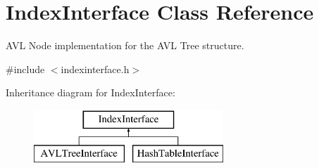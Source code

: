 \hypertarget{class_index_interface}{}\section{Index\+Interface Class Reference}
\label{class_index_interface}


A\+V\+L Node implementation for the A\+V\+L Tree structure.  




{\ttfamily \#include $<$indexinterface.\+h$>$}

Inheritance diagram for Index\+Interface\+:\begin{figure}[H]
\begin{center}
\leavevmode
\includegraphics[height=2.000000cm]{class_index_interface}
\end{center}
\end{figure}
